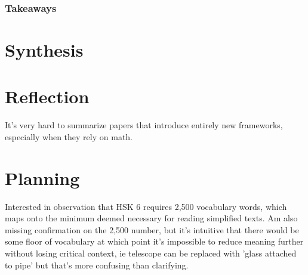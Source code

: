 \documentclass[
	letterpaper, %
]{jdf}
\begin{document}
\subsubsection{Takeaways}


\section{Synthesis}


\section{Reflection}
It's very hard to summarize papers that introduce entirely new frameworks, especially when they rely on math.
    
\section{Planning}

Interested in observation that HSK 6 requires 2,500 vocabulary words, which maps onto the minimum deemed necessary for reading simplified texts. Am also missing confirmation on the 2,500 number, but it's intuitive that there would be some floor of vocabulary at which point it's impossible to reduce meaning further without losing critical context, ie telescope can be replaced with 'glass attached to pipe' but that's more confusing than clarifying.


\printbibliography{}
\end{document}
